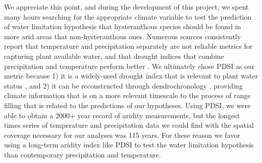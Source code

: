 \documentclass{article}[12pt]
\begin{document}
We appreciate this point, and during the development of this project, we spent many hours searching for the appropriate climate variable to test the prediction of water limitation hypothesis that hysteranthous species should be found in more arid areas that non-hysteranthous ones. Numerous sources consistently report that temperature and precipitation separately are not reliable metrics for capturing plant available water, and that drought indices that combine precipitation and temperature perform better \citep{Moles_2014,Piedallu_2013,Hickler_2009}. We ultimately chose PDSI as our metric because 1) it is a widely-used drought index that is relevant to plant water status \citep{Dai:2004aa,MIKA2005223}, and 2) it can be reconstructed through dendrochronology \citep{Cook_2010}, providing climate information that is on a more relevant timescale to the process of range filling that is related to the predictions of our hypotheses. Using PDSI, we were able to obtain a 2000+ year record of aridity measurements, but the longest times series of temperature and precipitation data we could find with the spatial coverage necessary for our analyses was 115 years. %
For these reason we favor using a long-term aridity index like PDSI to test the water limitation hypothesis than contemporary precipitation and temperature. 



\end{document}
